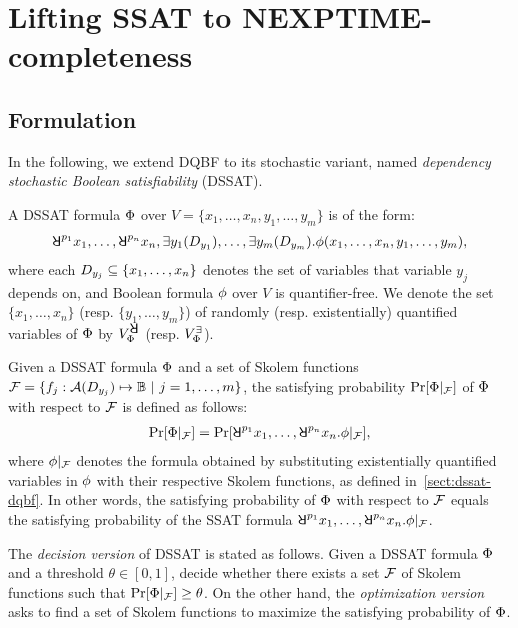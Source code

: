 \section{Lifting SSAT to NEXPTIME-completeness}
\label{sect:dssat-technique}

\subsection{Formulation}
In the following, we extend DQBF to its stochastic variant,
named \textit{dependency stochastic Boolean satisfiability} (DSSAT).

A DSSAT formula $\Phi$ over $V=\{x_1,\ldots,x_n,y_1,\ldots,y_m\}$ is of the form:
\begin{align}
    \label{eq:dssat}
    \random{p_1}x_1,\ldots,\random{p_n}x_n,\exists y_1(\dep{y_1}),\ldots,\exists y_m(\dep{y_m}).\pf(x_1,\ldots,x_n,y_1,\ldots,y_m),
\end{align}
where each $D_{y_j}\subseteq\{x_1,\ldots,x_n\}$ denotes the set of variables that variable $y_j$ depends on,
and Boolean formula $\phi$ over $V$ is quantifier-free.
We denote the set $\{x_1,\ldots,x_n\}$ (resp. $\{y_1,\ldots,y_m\}$) of randomly (resp. existentially) quantified variables of $\Phi$ by $\rvs$ (resp. $V_{\Phi}^{\exists}$).

Given a DSSAT formula $\Phi$ and a set of Skolem functions
$\skf=\{f_j:\av{\dep{y_j}}\mapsto\booldom\ |\ j=1,\ldots,m\}$,
the satisfying probability $\Pr[\Phi|_{\mathcal{F}}]$ of $\Phi$ with respect to $\mathcal{F}$ is defined as follows:
\begin{align}\label{eq:dssat-probability}
    \spb{\pcf{\Qf}{\skf}}=\spb{\random{p_1}x_1,\ldots,\random{p_n}x_n.\pcf{\pf}{\skf}},
\end{align}
where $\phi|_{\mathcal{F}}$ denotes the formula obtained by substituting existentially quantified variables in $\phi$ with their respective Skolem functions, as defined in~\cref{sect:dssat-dqbf}.
In other words, the satisfying probability of $\Phi$ with respect to $\mathcal{F}$ equals
the satisfying probability of the SSAT formula $\random{p_1}x_1,\ldots,\random{p_n}x_n.\pcf{\pf}{\skf}$.

The \textit{decision version} of DSSAT is stated as follows.
Given a DSSAT formula $\Phi$ and a threshold $\theta\in[0,1]$,
decide whether there exists a set $\mathcal{F}$ of Skolem functions such that $\Pr[\Phi|_{\mathcal{F}}]\geq\theta$.
On the other hand, the \textit{optimization version} asks to find a set of Skolem functions to maximize the satisfying probability of $\Phi$.

